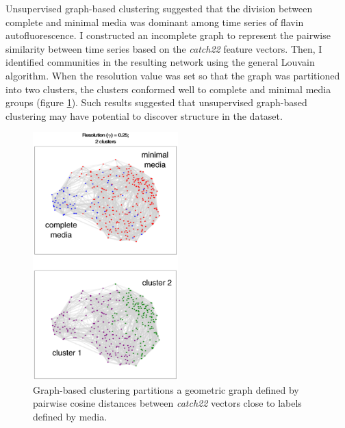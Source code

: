 Unsupervised graph-based clustering suggested that the division between complete and minimal media was dominant among time series of flavin autofluorescence. %
I constructed an incomplete graph to represent the pairwise similarity between time series based on the \textit{catch22} feature vectors.
Then, I identified communities in the resulting network using the general Louvain algorithm.
When the resolution value was set so that the graph was partitioned into two clusters, the clusters conformed well to complete and minimal media groups (figure \ref{fig:EffectofMediaClusters}). %
Such results suggested that unsupervised graph-based clustering may have potential to discover structure in the dataset.


\begin{figure}[htbp]
  \centering
  \includegraphics[width=0.5\textwidth]{10m_EffectofMediaClusters}
  \caption{Graph-based clustering partitions a geometric graph defined by pairwise cosine distances between \textit{catch22} vectors close to labels defined by media.}
  \label{fig:EffectofMediaClusters}
\end{figure}

